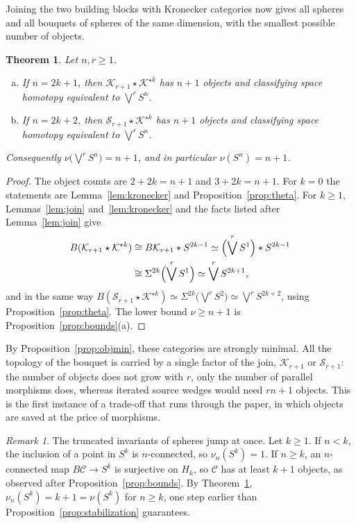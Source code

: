 \documentclass[12pt]{amsart}
\newtheorem{theorem}[teo]{Theorem}
\theoremstyle{definition}
\theoremstyle{remark}
\newtheorem{remark}[teo]{Remark}
\newcommand{\CC}{\mathcal{C}}
\newcommand{\K}{\mathcal{K}}
\newcommand{\Sph}{\mathcal{S}}
\begin{document}
Joining the two building blocks with Kronecker categories now gives all spheres and all bouquets of spheres of the same dimension, with the smallest possible number of objects.

\begin{theorem}\label{thm:bouquets}
Let $n,r\ge1$.
\begin{enumerate}[(a)]
\item If $n=2k+1$, then $\K_{r+1}\star\K^{\star k}$ has $n+1$ objects and classifying space homotopy equivalent to $\bigvee^rS^n$.
\item If $n=2k+2$, then $\Sph_{r+1}\star\K^{\star k}$ has $n+1$ objects and classifying space homotopy equivalent to $\bigvee^rS^n$.
\end{enumerate}
Consequently $\nu\bigl(\bigvee^rS^n\bigr)=n+1$, and in particular $\nu(S^n)=n+1$.
\end{theorem}

\begin{proof}
The object counts are $2+2k=n+1$ and $3+2k=n+1$. For $k=0$ the statements are Lemma~\ref{lem:kronecker} and Proposition~\ref{prop:theta}. For $k\ge1$, Lemmas~\ref{lem:join} and~\ref{lem:kronecker} and the facts listed after Lemma~\ref{lem:join} give
\begin{align*}
B(\K_{r+1}\star\K^{\star k})&\cong B\K_{r+1}*S^{2k-1}\simeq\Bigl(\bigvee^rS^1\Bigr)*S^{2k-1}\\
&\cong\Sigma^{2k}\Bigl(\bigvee^rS^1\Bigr)\simeq\bigvee^rS^{2k+1},
\end{align*}
and in the same way $B(\Sph_{r+1}\star\K^{\star k})\simeq\Sigma^{2k}\bigl(\bigvee^rS^2\bigr)\simeq\bigvee^rS^{2k+2}$, using Proposition~\ref{prop:theta}. The lower bound $\nu\ge n+1$ is Proposition~\ref{prop:bounds}(a).
\end{proof}

By Proposition~\ref{prop:objmin}, these categories are strongly minimal. All the topology of the bouquet is carried by a single factor of the join, $\K_{r+1}$ or $\Sph_{r+1}$: the number of objects does not grow with $r$, only the number of parallel morphisms does, whereas iterated source wedges would need $rn+1$ objects. This is the first instance of a trade-off that runs through the paper, in which objects are saved at the price of morphisms.

\begin{remark}\label{ex:nu-n-spheres}
The truncated invariants of spheres jump at once. Let $k\ge1$. If $n<k$, the inclusion of a point in $S^k$ is $n$-connected, so $\nu_n(S^k)=1$. If $n\ge k$, an $n$-connected map $B\CC\to S^k$ is surjective on $H_k$, so $\CC$ has at least $k+1$ objects, as observed after Proposition~\ref{prop:bounds}. By Theorem~\ref{thm:bouquets}, $\nu_n(S^k)=k+1=\nu(S^k)$ for $n\ge k$, one step earlier than Proposition~\ref{prop:stabilization} guarantees.
\end{remark}
\end{document}
